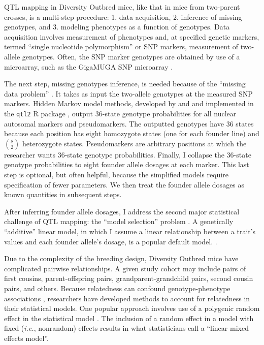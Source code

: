 \documentclass[oneside]{book}\usepackage[]{graphicx}\usepackage[]{color}
\begin{document}
QTL mapping in Diversity Outbred mice, like that in mice from two-parent 
crosses, is a multi-step procedure: 1. data acquisition, 2. inference of 
missing genotypes, and 3. modeling phenotypes as a function of genotypes. 
Data acquisition involves measurement of phenotypes and, at specified 
genetic markers, termed ``single nucleotide polymorphism'' or SNP markers, 
measurement of two-allele genotypes. Often, the SNP marker genotypes are 
obtained by use of a microarray, such as the GigaMUGA SNP microarray 
\citep{morgan2015mouse}. 

The next step, missing genotypes inference, is needed because of the 
``missing data problem'' \citep{broman2009guide}. It takes as input the two-allele 
genotypes at the measured SNP markers. Hidden Markov model methods, developed by
\citet{broman2012haplotype} and \citet{broman2012genotype} and implemented in the \texttt{qtl2} R 
package \citep{broman2019rqtl2}, output 36-state genotype probabilities for all 
nuclear autosomal markers and pseudomarkers. The outputted genotypes have 36 states 
because each position has eight homozygote states (one for each founder line) and $\binom{8}{2}$ heterozygote states. Pseudomarkers are 
arbitrary positions at which the researcher wants 36-state genotype probabilities. 
Finally, I collapse the 36-state genotype probabilities to eight founder allele 
dosages at each marker. This last step is optional, but often helpful, because the 
simplified models require specification of fewer parameters. We then treat the 
founder allele dosages as known quantities in subsequent steps. 


After inferring founder allele dosages, I address the
second major statistical challenge of 
QTL mapping: the ``model selection'' problem \citep{broman2009guide}.
A genetically ``additive'' linear model, in which
I assume a linear relationship between
a trait's values and each founder allele's dosage, is a popular default model.
\citep{gatti2014quantitative,broman2019rqtl2}.




Due to the complexity of the breeding design, Diversity Outbred mice
have 
complicated pairwise relationships. A given study cohort may include pairs of first
cousins, parent-offspring pairs, grandparent-grandchild pairs, second cousin pairs, and others.
Because relatedness can confound genotype-phenotype associations 
\citep{yang2014advantages}, researchers have developed methods to account 
for relatedness in their statistical models. One popular approach involves 
use of a polygenic random effect in the statistical model \citep{kang2008efficient}.
The inclusion of a random effect in a model with fixed (\emph{i.e.}, nonrandom)
effects results in what statisticians call a ``linear mixed effects model''. 
\end{document}
